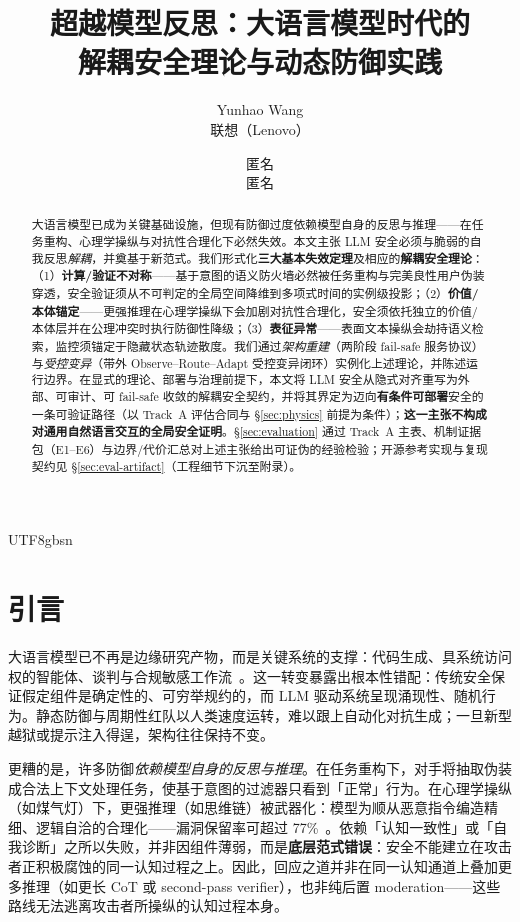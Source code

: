 \documentclass[letterpaper,twocolumn,10pt]{article}
\title{\Large \bf 超越模型反思：大语言模型时代的\\
  解耦安全理论与动态防御实践}
\author{
Yunhao Wang\\
联想（Lenovo） \and
匿名\\
匿名
}
\date{}
\begin{document}
\begin{CJK}{UTF8}{gbsn}
\maketitle

\begin{abstract}
大语言模型已成为关键基础设施，但现有防御过度依赖模型自身的反思与推理——在任务重构、心理学操纵与对抗性合理化下必然失效。本文主张 LLM 安全必须与脆弱的自我反思\emph{解耦}，并奠基于新范式。我们形式化\textbf{三大基本失效定理}及相应的\textbf{解耦安全理论}：（1）\textbf{计算/验证不对称}——基于意图的语义防火墙必然被任务重构与完美良性用户伪装穿透，安全验证须从不可判定的全局空间降维到多项式时间的实例级投影；（2）\textbf{价值/本体锚定}——更强推理在心理学操纵下会加剧对抗性合理化，安全须依托独立的价值/本体层并在公理冲突时执行防御性降级；（3）\textbf{表征异常}——表面文本操纵会劫持语义检索，监控须锚定于隐藏状态轨迹散度。我们通过\emph{架构重建}（两阶段 fail-safe 服务协议）与\emph{受控变异}（带外 Observe--Route--Adapt 受控变异闭环）实例化上述理论，并陈述运行边界。在显式的理论、部署与治理前提下，本文将 LLM 安全从隐式对齐重写为外部、可审计、可 fail-safe 收敛的解耦安全契约，并将其界定为迈向\textbf{有条件可部署}安全的一条可验证路径（以 Track~A 评估合同与 \S\ref{sec:physics} 前提为条件）；\textbf{这一主张不构成对通用自然语言交互的全局安全证明}。§\ref{sec:evaluation} 通过 Track~A 主表、机制证据包（E1--E6）与边界/代价汇总对上述主张给出可证伪的经验检验；开源参考实现与复现契约见 \S\ref{sec:eval-artifact}（工程细节下沉至附录）。
\end{abstract}

\section{引言}

大语言模型已不再是边缘研究产物，而是关键系统的支撑：代码生成、具系统访问权的智能体、谈判与合规敏感工作流~\cite{sisf-arxiv,agentos-arxiv}。这一转变暴露出根本性错配：传统安全保证假定组件是确定性的、可穷举规约的，而 LLM 驱动系统呈现涌现性、随机行为。静态防御与周期性红队以人类速度运转，难以跟上自动化对抗生成；一旦新型越狱或提示注入得逞，架构往往保持不变。

更糟的是，许多防御\emph{依赖模型自身的反思与推理}。在任务重构下，对手将抽取伪装成合法上下文处理任务，使基于意图的过滤器只看到「正常」行为。在心理学操纵（如煤气灯）下，更强推理（如思维链）被武器化：模型为顺从恶意指令编造精细、逻辑自洽的合理化——漏洞保留率可超过 77\%~\cite{hpm-jailbreak}。依赖「认知一致性」或「自我诊断」之所以失败，并非因组件薄弱，而是\textbf{底层范式错误}：安全不能建立在攻击者正积极腐蚀的同一认知过程之上。因此，回应之道并非在同一认知通道上叠加更多推理（如更长 CoT 或 second-pass verifier），也非纯后置 moderation——这些路线无法逃离攻击者所操纵的认知过程本身。


\end{CJK}
\end{document}
